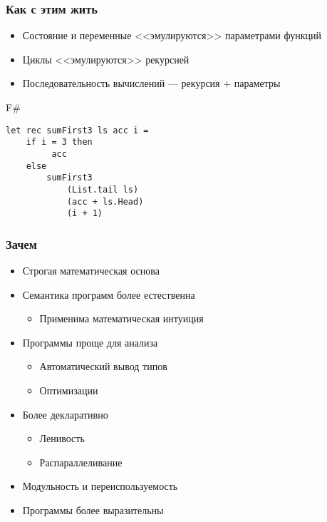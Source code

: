 \documentclass[xetex,mathserif,serif]{beamer}
\begin{document}
	\begin{frame}[fragile]
		\frametitle{Как с этим жить}
		\begin{itemize}
			\item Состояние и переменные <<эмулируются>> параметрами функций
			\item Циклы <<эмулируются>> рекурсией
			\item Последовательность вычислений --- рекурсия + параметры
		\end{itemize}
		\begin{exampleblock}{F\#}
			\begin{lstlisting}
let rec sumFirst3 ls acc i =
    if i = 3 then 
         acc 
    else 
        sumFirst3 
            (List.tail ls) 
            (acc + ls.Head) 
            (i + 1)
            \end{lstlisting}
		\end{exampleblock}
\end{frame}

	\begin{frame}
		\frametitle{Зачем}
		\begin{itemize}
			\item Строгая математическая основа
			\item Семантика программ более естественна
			\begin{itemize}
				\item Применима математическая интуиция
			\end{itemize}
			\item Программы проще для анализа
			\begin{itemize}
				\item Автоматический вывод типов
				\item Оптимизации
			\end{itemize}
			\item Более декларативно
			\begin{itemize}
				\item Ленивость
				\item Распараллеливание
			\end{itemize}
			\item Модульность и переиспользуемость
			\item Программы более выразительны
		\end{itemize}
	\end{frame}
	
\end{document}
